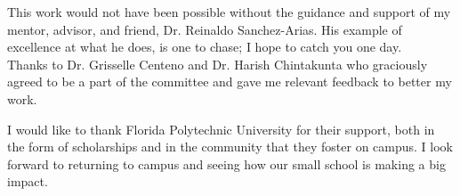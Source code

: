 %
%
%

\begin{acknowledgments}
This work would not have been possible without the guidance and support of my mentor, advisor, and friend, Dr. Reinaldo Sanchez-Arias. His example of excellence at what he does, is one to chase; I hope to catch you one day.\\

Thanks to Dr. Grisselle Centeno and Dr. Harish Chintakunta who graciously agreed to be a part of the committee and gave me relevant feedback to better my work.

I would like to thank Florida Polytechnic University for their support, both in the form of scholarships and in the community that they foster on campus. I look forward to returning to campus and seeing how our small school is making a big impact. 
\end{acknowledgments}

\pagebreak